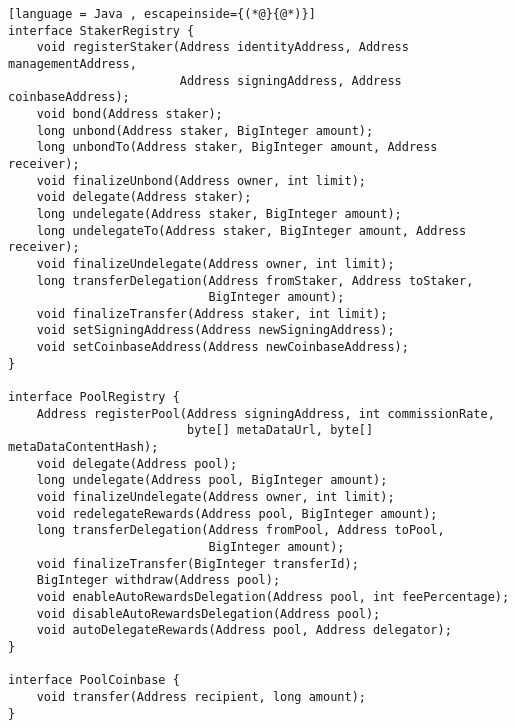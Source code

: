 \begin{lstlisting}[language = Java , escapeinside={(*@}{@*)}]
interface StakerRegistry {
    void registerStaker(Address identityAddress, Address managementAddress,
                        Address signingAddress, Address coinbaseAddress);
    void bond(Address staker);
    long unbond(Address staker, BigInteger amount);
    long unbondTo(Address staker, BigInteger amount, Address receiver);
    void finalizeUnbond(Address owner, int limit);
    void delegate(Address staker);
    long undelegate(Address staker, BigInteger amount);
    long undelegateTo(Address staker, BigInteger amount, Address receiver);
    void finalizeUndelegate(Address owner, int limit);
    long transferDelegation(Address fromStaker, Address toStaker, 
                            BigInteger amount);
    void finalizeTransfer(Address staker, int limit);
    void setSigningAddress(Address newSigningAddress);
    void setCoinbaseAddress(Address newCoinbaseAddress);
}

interface PoolRegistry {
    Address registerPool(Address signingAddress, int commissionRate, 
                         byte[] metaDataUrl, byte[] metaDataContentHash);
    void delegate(Address pool);
    long undelegate(Address pool, BigInteger amount);
    void finalizeUndelegate(Address owner, int limit);
    void redelegateRewards(Address pool, BigInteger amount);
    long transferDelegation(Address fromPool, Address toPool, 
                            BigInteger amount);
    void finalizeTransfer(BigInteger transferId);
    BigInteger withdraw(Address pool);
    void enableAutoRewardsDelegation(Address pool, int feePercentage);
    void disableAutoRewardsDelegation(Address pool);
    void autoDelegateRewards(Address pool, Address delegator);
}

interface PoolCoinbase { 
    void transfer(Address recipient, long amount); 
}

\end{lstlisting}
\clearpage